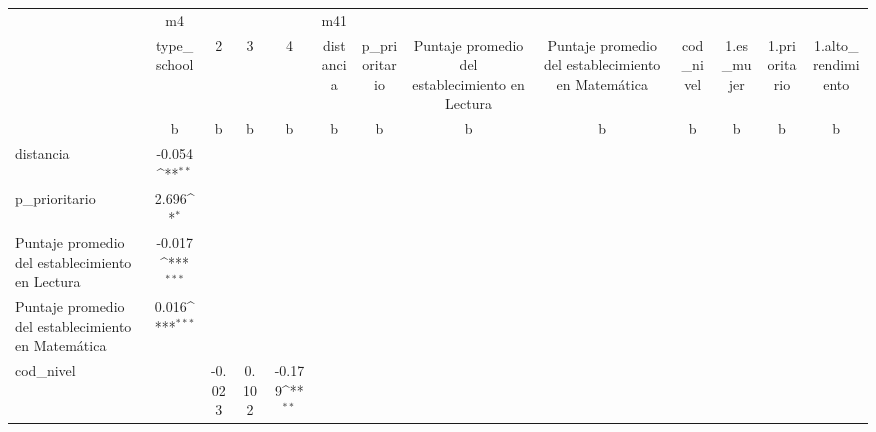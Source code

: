 {
\def\sym#1{\ifmmode^{#1}\else\(^{#1}\)\fi}
\begin{tabular}{l*{12}{c}}
\toprule
                    &          m4         &                     &                     &                     &         m41         &                     &                     &                     &                     &                     &                     &                     \\
                    & type\_school         &           2         &           3         &           4         &   distancia         &p\_prioritario         &Puntaje promedio del establecimiento en Lectura         &Puntaje promedio del establecimiento en Matemática         &   cod\_nivel         &  1.es\_mujer         &1.prioritario         &1.alto\_rendimiento         \\
                    &           b         &           b         &           b         &           b         &           b         &           b         &           b         &           b         &           b         &           b         &           b         &           b         \\
\midrule
distancia           &      -0.054\sym{**} &                     &                     &                     &                     &                     &                     &                     &                     &                     &                     &                     \\
p\_prioritario       &       2.696\sym{*}  &                     &                     &                     &                     &                     &                     &                     &                     &                     &                     &                     \\
Puntaje promedio del establecimiento en Lectura&      -0.017\sym{***}&                     &                     &                     &                     &                     &                     &                     &                     &                     &                     &                     \\
Puntaje promedio del establecimiento en Matemática&       0.016\sym{***}&                     &                     &                     &                     &                     &                     &                     &                     &                     &                     &                     \\
cod\_nivel           &                     &      -0.023         &       0.102         &      -0.179\sym{**} &                     &                     &                     &                     &                     &                     &                     &                     \\

\end{tabular}}

